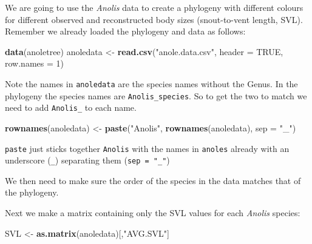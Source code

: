 \documentclass[]{book}
\newenvironment{Shaded}{\begin{snugshade}}{\end{snugshade}}
\newcommand{\KeywordTok}[1]{\textcolor[rgb]{0.13,0.29,0.53}{\textbf{{#1}}}}
\newcommand{\DataTypeTok}[1]{\textcolor[rgb]{0.13,0.29,0.53}{{#1}}}
\newcommand{\DecValTok}[1]{\textcolor[rgb]{0.00,0.00,0.81}{{#1}}}
\newcommand{\StringTok}[1]{\textcolor[rgb]{0.31,0.60,0.02}{{#1}}}
\newcommand{\OtherTok}[1]{\textcolor[rgb]{0.56,0.35,0.01}{{#1}}}
\newcommand{\NormalTok}[1]{{#1}}
\begin{document}
We are going to use the \emph{Anolis} data to create a phylogeny with
different colours for different observed and reconstructed body sizes
(snout-to-vent length, SVL). Remember we already loaded the phylogeny
and data as follows:

\begin{Shaded}
\begin{Highlighting}[]
\KeywordTok{data}\NormalTok{(anoletree)}
\NormalTok{anoledata <-}\StringTok{ }\KeywordTok{read.csv}\NormalTok{(}\StringTok{"anole.data.csv"}\NormalTok{, }\DataTypeTok{header =} \OtherTok{TRUE}\NormalTok{, }\DataTypeTok{row.names =} \DecValTok{1}\NormalTok{) }
\end{Highlighting}
\end{Shaded}

Note the names in \texttt{anoledata} are the species names without the
Genus. In the phylogeny the species names are \texttt{Anolis\_species}.
So to get the two to match we need to add \texttt{Anolis\_} to each
name.

\begin{Shaded}
\begin{Highlighting}[]
\KeywordTok{rownames}\NormalTok{(anoledata) <-}\StringTok{ }\KeywordTok{paste}\NormalTok{(}\StringTok{"Anolis"}\NormalTok{, }\KeywordTok{rownames}\NormalTok{(anoledata), }\DataTypeTok{sep =} \StringTok{"_"}\NormalTok{)}
\end{Highlighting}
\end{Shaded}

\texttt{paste} just sticks together \texttt{Anolis} with the names in
\texttt{anoles} already with an underscore (\texttt{\_}) separating them
(\texttt{sep\ =\ "\_"})

We then need to make sure the order of the species in the data matches
that of the phylogeny.

\begin{Shaded}
\end{Shaded}

Next we make a matrix containing only the SVL values for each
\emph{Anolis} species:

\begin{Shaded}
\begin{Highlighting}[]
\NormalTok{SVL <-}\StringTok{ }\KeywordTok{as.matrix}\NormalTok{(anoledata)[,}\StringTok{"AVG.SVL"}\NormalTok{]}
\end{Highlighting}
\end{Shaded}
\end{document}
